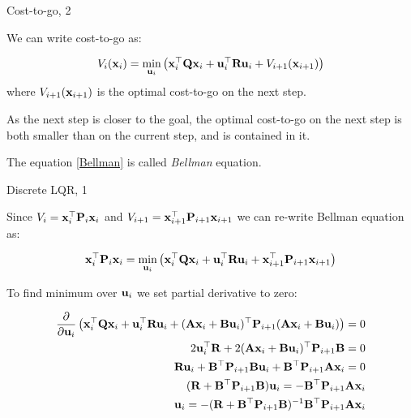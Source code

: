 \documentclass{beamer}
\begin{document}
\begin{frame}{Cost-to-go, 2}
	\begin{flushleft}
		
		We can write cost-to-go as:
		
		\begin{equation}
			\label{Bellman}
			V_i(\mathbf{x}_i) = \underset{\mathbf{u}_i}{\text{min}} 
						\left(
						\mathbf{x}_i^\top \mathbf{Q} \mathbf{x}_i +  \mathbf{u}_i^\top \mathbf{R} \mathbf{u}_i  + V_{i+1}(\mathbf{x}_{i+1})  
						\right)
		\end{equation}
		where $V_{i+1}(\mathbf{x}_{i+1})$ is the optimal cost-to-go on the next step. 
		
		\bigskip
		
		As the next step is closer to the goal, the optimal cost-to-go on the next step is both smaller than on the current step, and is contained in it.
		
		\bigskip
		
		The equation \eqref{Bellman} is called \emph{Bellman} equation.
		
	\end{flushleft}
\end{frame}



\begin{frame}{Discrete LQR, 1}
	\begin{flushleft}
		
		Since $V_i = \mathbf{x}_i^\top \mathbf{P}_i \mathbf{x}_i$ and $V_{i+1} = \mathbf{x}_{i+1}^\top \mathbf{P}_{i+1} \mathbf{x}_{i+1}$ we can re-write Bellman equation as:
		
		\begin{equation}
						\mathbf{x}_i^\top \mathbf{P}_i \mathbf{x}_i = \underset{\mathbf{u}_i}{\text{min}} 
			\left(
			\mathbf{x}_i^\top \mathbf{Q} \mathbf{x}_i +  \mathbf{u}_i^\top \mathbf{R} \mathbf{u}_i  + \mathbf{x}_{i+1}^\top \mathbf{P}_{i+1} \mathbf{x}_{i+1}
			 \right)
		\end{equation}
		
		To find minimum over $\mathbf{u}_i$ we set partial derivative to zero:
		
		\begin{align*}
			\frac{\partial}{\partial \mathbf{u}_i}
			\left( 
			\mathbf{x}_i ^\top \mathbf{Q} \mathbf{x}_i  +  \mathbf{u}_i^\top \mathbf{R}\mathbf{u}_i + 
			(\mathbf{A}\mathbf{x}_i  + \mathbf{B}\mathbf{u}_i)^\top \mathbf{P}_{i+1} (\mathbf{A}\mathbf{x}_i  + \mathbf{B}\mathbf{u}_i) 
			\right) = 0
			\\
			2\mathbf{u}_i^\top \mathbf{R}  + 
			2(\mathbf{A}\mathbf{x}_i + \mathbf{B}\mathbf{u}_i)^\top \mathbf{P}_{i+1} \mathbf{B} = 0
			\\
			\mathbf{R}\mathbf{u}_i + \mathbf{B}^\top \mathbf{P}_{i+1} \mathbf{B} \mathbf{u}_i + \mathbf{B}^\top \mathbf{P}_{i+1} \mathbf{A}\mathbf{x}_i  = 0
			\\
			(\mathbf{R} + \mathbf{B}^\top \mathbf{P}_{i+1} \mathbf{B}) \mathbf{u}_i = -\mathbf{B}^\top \mathbf{P}_{i+1} \mathbf{A}\mathbf{x}_i 
			\\
			\mathbf{u}_i = -(\mathbf{R} + \mathbf{B}^\top \mathbf{P}_{i+1} \mathbf{B})^{-1} \mathbf{B}^\top \mathbf{P}_{i+1} \mathbf{A}\mathbf{x}_i 
		\end{align*}

		
	\end{flushleft}
\end{frame}
\end{document}
